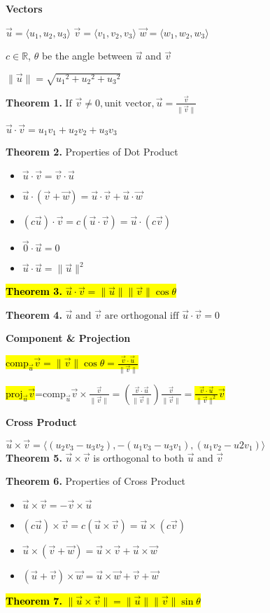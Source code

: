 \documentclass{article}
\newcommand{\headingsmall}[1]{{\small\textbf{#1}}}
\def\*#1{\vec{#1}}
\begin{document}
\setlength{\parskip}{0pt}
\scriptsize                %
\setlength\parindent{0pt}  %

\begin{multicols*}{4}

\headingsmall{Vectors}

${\*u}= \langle u_1, u_2, u_3 \rangle$
${\*v}= \langle v_1, v_2, v_3 \rangle$
${\*w}= \langle w_1, w_2, w_3 \rangle$

$c\in\mathbb{R}$,
$\theta$ be the angle between $\*u$ and $\*v$

$\|{\*u}\|=\sqrt{{u_1}^2+{u_2}^2+{u_3}^2}$

\textbf{Theorem 1.} $\text{If } \*v \neq 0, \text{unit vector}, {\*u}=\frac{\*v}{\|{\*v}\|}$

$\*u\cdot\*v=u_1v_1+u_2v_2+u_3v_3$

\textbf{Theorem 2.} Properties of Dot Product
\begin{itemize}[nosep]
	\item $\*u\cdot\*v=\*v\cdot\*u$
	\item $\*u\cdot(\*v+\*w)=\*u\cdot\*v+\*u\cdot\*w$
	\item $(c\*u)\cdot\*v=c(\*u\cdot\*v)=\*u\cdot(c\*v)$
	\item $\*0\cdot\*u=0$
	\item $\*u\cdot\*u=\|\*u\|^2$
\end{itemize}

\hl{\textbf{Theorem 3.} $\*u\cdot\*v=\|\*u\|\|\*v\|\cos\theta$}

\textbf{Theorem 4.} $\*u\text{ and } \*v \text{ are orthogonal iff }\*u\cdot\*v=0$

\textbf{Component \& Projection}

\centerline{\hl{$\text{comp}_{\*u}\*v=\|\*v\|\cos\theta=\frac{\*v\cdot\*u}{\|\*v\|}$}}\centerline{\hl{$\text{proj}_{\*u}\*v$}=$\text{comp}_{\*u}\*v\times\frac{\*v}{\|\*v\|}=\left(\frac{\*v\cdot\*u}{\|\*v\|}\right)\frac{\*v}{\|\*v\|}=$\hl{$\frac{\*v\cdot\*u}{\|\*v\|^2}\*v$}}
\textbf{Cross Product}

$\*u\times\*v=\langle (u_2v_3-u_3v_2),-(u_1v_3-u_3v_1),(u_1v_2-u2v_1)\rangle$\\
\textbf{Theorem 5.} $\*u\times\*v$ is orthogonal to both $\*u \text{ and } \*v$

\textbf{Theorem 6.} Properties of Cross Product
\begin{itemize}[nosep]
	\item $\*u\times\*v=-\*v\times\*u$
	\item $(c\*u)\times\*v=c(\*u\times\*v)=\*u\times(c\*v)$
	\item $\*u\times(\*v+\*w)=\*u\times\*v+\*u\times\*w$
	\item $(\*u+\*v)\times\*w=\*u\times\*w+\*v+\*w$
\end{itemize}
\hl{\textbf{Theorem 7.} $\|\*u\times\*v\|=\|\*u\|\|\*v\|\sin\theta$}


\end{multicols*}
\end{document}

